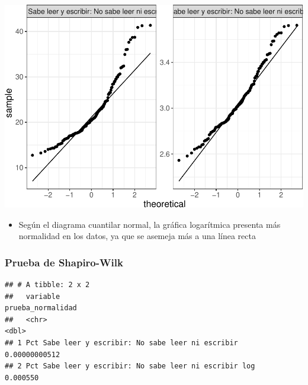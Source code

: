 \documentclass[11pt,]{article}
\newenvironment{Shaded}{\begin{snugshade}}{\end{snugshade}}
\newcommand{\KeywordTok}[1]{\textcolor[rgb]{0.13,0.29,0.53}{\textbf{#1}}}
\newcommand{\DataTypeTok}[1]{\textcolor[rgb]{0.13,0.29,0.53}{#1}}
\newcommand{\StringTok}[1]{\textcolor[rgb]{0.31,0.60,0.02}{#1}}
\newcommand{\OperatorTok}[1]{\textcolor[rgb]{0.81,0.36,0.00}{\textbf{#1}}}
\newcommand{\NormalTok}[1]{#1}
\providecommand{\tightlist}{%
\setlength{\itemsep}{0pt}\setlength{\parskip}{0pt}}
\begin{document}
\includegraphics{proyecto_files/figure-latex/unnamed-chunk-7-1.pdf}

\begin{itemize}
\tightlist
\item
  Según el diagrama cuantilar normal, la gráfica logarítmica presenta
  más normalidad en los datos, ya que se asemeja más a una línea recta
\end{itemize}

\subsubsection{Prueba de Shapiro-Wilk}\label{prueba-de-shapiro-wilk-1}

\begin{Shaded}
\end{Shaded}

\begin{verbatim}
## # A tibble: 2 x 2
##   variable                                               prueba_normalidad
##   <chr>                                                              <dbl>
## 1 Pct Sabe leer y escribir: No sabe leer ni escribir         0.00000000512
## 2 Pct Sabe leer y escribir: No sabe leer ni escribir log     0.000550
\end{verbatim}
\end{document}
